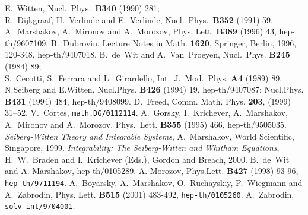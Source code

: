 \documentclass[a4paper,]{article}
\begin{document}
\begin{thebibliography}{22}
%
E.~Witten, Nucl.\ Phys.\ {\bf B340} (1990) 281;\\
R.~Dijkgraaf, H.~Verlinde and E.~Verlinde,
Nucl.\ Phys.\ {\bf B352} (1991) 59.
%
A.~Marshakov, A.~Mironov and A.~Morozov,
Phys. Lett. {\bf B389} (1996) 43, hep-th/9607109.
%
 B.~Dubrovin, Lecture Notes in Math. {\bf 1620},
Springer, Berlin, 1996, 120-348, hep-th/9407018.
%
B.~de~Wit and A.~Van~Proeyen, Nucl.~Phys. {\bf B245} (1984) 89;\\
S.~Cecotti, S.~Ferrara and L.~Girardello, Int.~J.~Mod.~Phys. {\bf A4}
(1989) 89.
%
N.Seiberg and E.Witten, Nucl.Phys. {\bf B426} (1994) 19,
hep-th/9407087; Nucl.Phys. {\bf B431} (1994) 484,
hep-th/9408099.
%
 D.~Freed,
Comm. Math. Phys. {\bf 203}, (1999) 31--52.
%
V.~Cortes,
{\tt math.DG/0112114}.
%
A.~Gorsky, I.~Krichever, A.~Marshakov, A.~Mironov and A.~Morozov,
Phys.~Lett. {\bf B355} (1995) 466, hep-th/9505035.
%
 {\sl Seiberg-Witten Theory and Integrable Systems},
A.~Marshakov, World Scientific, Singapore, 1999.
%
 {\sl Integrability: The Seiberg-Witten and Whitham Equations},
H.~W.~Braden and I.~Krichever (Eds.),
Gordon and Breach, 2000.
%
B.~de~Wit and A. Marshakov, hep-th/0105289.
%
A. Morozov, 
Phys.Lett. {\bf B427} (1998) 93-96,
{\tt hep-th/9711194}.
%
A.~Boyarsky, A.~Marshakov, O.~Ruchayskiy, P.~Wiegmann
and A.~Zabrodin, Phys. Lett. {\bf B515} (2001) 483-492, {\tt hep-th/0105260}.
%
A.~Zabrodin, 
{\tt solv-int/9704001}.

\end{thebibliography}
\end{document}
